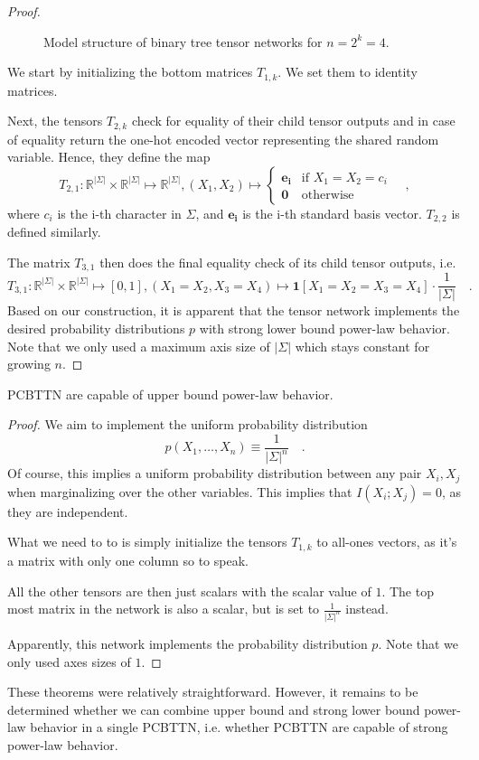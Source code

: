 \documentclass[../../main.tex]{subfiles}
\begin{document}
\begin{proof}
\begin{figure}[h]
\begin{tikzpicture}
            \end{tikzpicture}
            \caption{Model structure of binary tree tensor networks for $n = 2^k = 4$.}
            \label{fig:binary_tree_tensor_network_n_equals_four_2}
        \end{figure}
        
        We start by initializing the bottom matrices $T_{1,k}$. We set them to identity matrices.

        Next, the tensors $T_{2,k}$ check for equality of their child tensor outputs and in case of equality return the one-hot encoded vector representing the shared random variable. Hence, they define the map
        \[
            T_{2,1}: \mathbb{R}^{|\Sigma|} \times \mathbb{R}^{|\Sigma|} \mapsto \mathbb{R}^{|\Sigma|}, (X_1, X_2) \mapsto
            \begin{cases}
                \bm{e_i} & \text{if } X_1 = X_2 = c_i \\
                \bm{0} & \text{otherwise}
            \end{cases}
            \quad ,
        \]
        where $c_i$ is the i-th character in $\Sigma$, and $\bm{e_i}$ is the i-th standard basis vector. $T_{2,2}$ is defined similarly.

        The matrix $T_{3,1}$ then does the final equality check of its child tensor outputs, i.e.
        \[
            T_{3,1}: \mathbb{R}^{|\Sigma|} \times \mathbb{R}^{|\Sigma|} \mapsto [0, 1], (X_1 = X_2, X_3 = X_4) \mapsto \bm{1}[X_1 = X_2 = X_3 = X_4] \cdot \frac{1}{|\Sigma|} \quad .
        \]
        Based on our construction, it is apparent that the tensor network implements the desired probability distributions $p$ with strong lower bound power-law behavior. Note that we only used a maximum axis size of $|\Sigma|$ which stays constant for growing $n$.
    \end{proof}

    \begin{theorem}
        PCBTTN are capable of upper bound power-law behavior.
    \end{theorem}
    \begin{proof}
        We aim to implement the uniform probability distribution
        \[
            p(X_1, \dots, X_n) \equiv \frac{1}{|\Sigma|^n} \quad .
        \]
        Of course, this implies a uniform probability distribution between any pair $X_i, X_j$ when marginalizing over the other variables. This implies that $I(X_i;X_j) = 0$, as they are independent.

        What we need to to is simply initialize the tensors $T_{1,k}$ to all-ones vectors, as it's a matrix with only one column so to speak.

        All the other tensors are then just scalars with the scalar value of $1$. The top most matrix in the network is also a scalar, but is set to $\frac{1}{|\Sigma|^n}$ instead.

        Apparently, this network implements the probability distribution $p$. Note that we only used axes sizes of $1$.
    \end{proof}

    These theorems were relatively straightforward. However, it remains to be determined whether we can combine upper bound and strong lower bound power-law behavior in a single PCBTTN, i.e. whether PCBTTN are capable of strong power-law behavior.
\end{document}
